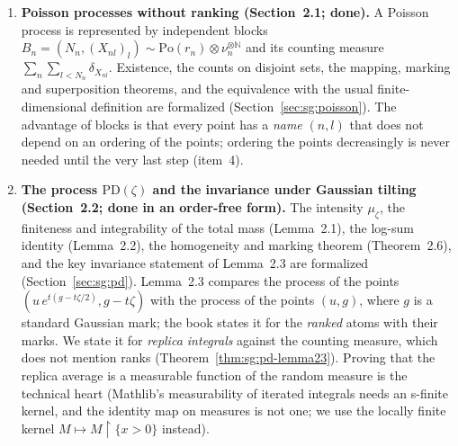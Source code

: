 \begin{enumerate}
\item \textbf{Poisson processes without ranking (Section~2.1; done).} A Poisson process is represented by independent blocks $B_n=(N_n,(X_{nl})_l)\sim\mathrm{Po}(r_n)\otimes\nu_n^{\otimes\mathbb N}$ and its counting measure $\sum_n\sum_{l<N_n}\delta_{X_{nl}}$. Existence, the counts on disjoint sets, the mapping, marking and superposition theorems, and the equivalence with the usual finite-dimensional definition are formalized (Section~\ref{sec:sg:poisson}). The advantage of blocks is that every point has a \emph{name} $(n,l)$ that does not depend on an ordering of the points; ordering the points decreasingly is never needed until the very last step (item~4).
\item \textbf{The process $\mathrm{PD}(\zeta)$ and the invariance under Gaussian tilting (Section~2.2; done in an order-free form).} The intensity $\mu_\zeta$, the finiteness and integrability of the total mass (Lemma~2.1), the log-sum identity (Lemma~2.2), the homogeneity and marking theorem (Theorem~2.6), and the key invariance statement of Lemma~2.3 are formalized (Section~\ref{sec:sg:pd}). Lemma~2.3 compares the process of the points $(u\,e^{t(g-t\zeta/2)},g-t\zeta)$ with the process of the points $(u,g)$, where $g$ is a standard Gaussian mark; the book states it for the \emph{ranked} atoms with their marks. We state it for \emph{replica integrals} against the counting measure, which does not mention ranks (Theorem~\ref{thm:sg:pd-lemma23}). Proving that the replica average is a measurable function of the random measure is the technical heart (Mathlib's measurability of iterated integrals needs an s-finite kernel, and the identity map on measures is not one; we use the locally finite kernel $M\mapsto M\!\restriction\!\{x>0\}$ instead).

\end{enumerate}
